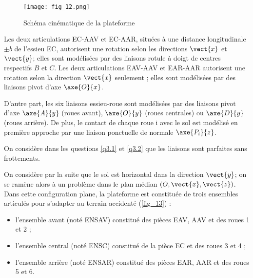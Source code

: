 \begin{figure}[H]
\centering
\texttt{[image: fig\_12.png]}
\caption{Schéma cinématique de la plateforme\label{fig_12}}
\end{figure}

Les deux articulations EC-AAV et EC-AAR, situées à une distance longitudinale $\pm b$ de l'essieu
EC, autorisent une rotation selon les directions $\vect{x}$ et $\vect{y}$; elles sont modélisées par des liaisons
rotule à doigt de centres respectifs $B$ et $C$. Les deux articulations EAV-AAV et EAR-AAR
autorisent une rotation selon la direction $\vect{x}$ seulement ; elles sont modélisées par des liaisons
pivot d'axe $\axe{O}{x}$.

D'autre part, les six liaisons essieu-roue sont modélisées par des liaisons pivot d'axe $\axe{A}{y}$
(roues avant), $\axe{O}{y}$ (roues centrales) ou $\axe{D}{y}$ (roues arrière). De plus, le contact de chaque
roue i avec le sol est modélisé en première approche par une liaison ponctuelle de normale
$\axe{P_i}{z}$.

On considère dans les questions \ref{q3.1} et \ref{q3.2} que les liaisons sont parfaites sans frottements.






On considère par la suite que le sol est horizontal dans la direction $\vect{y}$; on se ramène alors à un
problème dans le plan médian $\left(O,\vect{x},\vect{z}\right)$. Dans cette configuration plane, la plateforme est
constituée de trois ensembles articulés pour s'adapter au terrain accidenté (\autoref{fig_13}) :
\begin{itemize}
\item l'ensemble avant (noté ENSAV) constitué des pièces EAV, AAV et des roues 1 et 2 ;
\item l'ensemble central (noté ENSC) constitué de la pièce EC et des roues 3 et 4 ;
\item l'ensemble arrière (noté ENSAR) constitué des pièces EAR, AAR et des roues 5 et 6.
\end{itemize}

